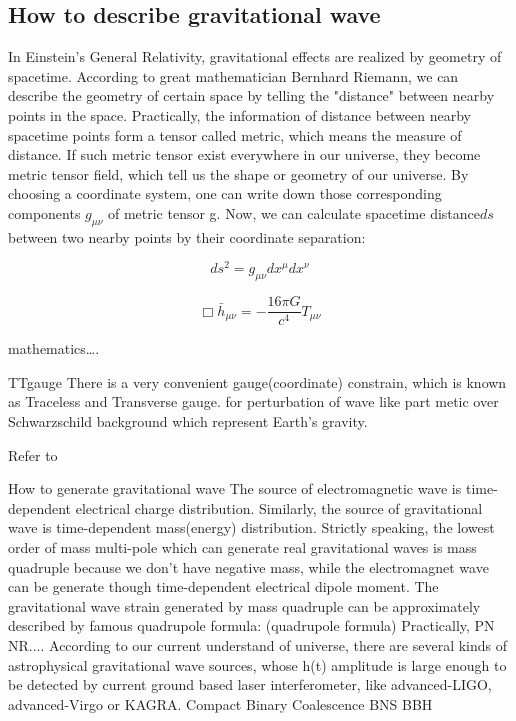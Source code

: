 \subsection{How to describe gravitational wave}

In Einstein's General Relativity, gravitational effects are realized by geometry of spacetime. According to great mathematician Bernhard Riemann, we can describe the geometry of certain space by telling the "distance" between nearby points in the space. Practically, the information of distance between nearby spacetime points form a tensor called metric, which means the measure of distance. If such metric tensor exist everywhere in our universe, they become metric tensor field, which tell us the shape or geometry of our universe. By choosing a coordinate system, one can write down those corresponding components $g_{\mu\nu}$ of metric tensor g. Now, we can calculate spacetime distance$ds$ between two nearby points by their coordinate separation:

\begin{equation}
    ds^2 = g_{\mu\nu} dx^{\mu} dx^{\nu}
\end{equation}




\begin{equation}
    \Box \bar{h}_{\mu\nu} = - \frac{16\pi G}{c^4}T_{\mu\nu}
\end{equation}


mathematics….

TTgauge
There is a very convenient gauge(coordinate) constrain, which is known as Traceless and Transverse gauge. 
for perturbation of wave like part metic over Schwarzschild background which represent Earth’s gravity.


Refer to \cite{maggiore:gw1}



How to generate gravitational wave
The source of electromagnetic wave is time-dependent electrical charge distribution.  Similarly, the source of gravitational wave is time-dependent mass(energy) distribution. Strictly speaking, the lowest order of mass multi-pole which can generate real gravitational waves is mass quadruple because we don’t have negative mass, while the electromagnet wave can be generate though time-dependent electrical dipole moment. The gravitational wave strain generated by mass quadruple can be approximately described by famous quadrupole formula:
(quadrupole formula)
Practically, PN NR....
According to our current understand of universe, there are several kinds of astrophysical gravitational wave sources, whose h(t) amplitude is large enough to be detected by current ground based laser interferometer, like advanced-LIGO, advanced-Virgo or KAGRA. 
Compact Binary Coalescence 
BNS BBH
